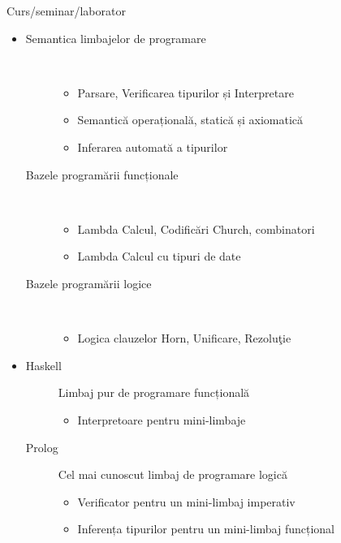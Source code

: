 \documentclass[xcolor=x11names,compress,10pt]{beamer}
\begin{document}
\begin{frame}{Curs/seminar/laborator}
\medskip
\begin{itemize}
\item {}
\begin{description}
\item[Semantica limbajelor de programare] \ 
	\begin{itemize}
	\item Parsare, Verificarea tipurilor și Interpretare
	\item Semantică operațională, statică și axiomatică
	\item Inferarea automată a tipurilor
	\end{itemize}
\item[Bazele programării funcționale] \ 
\begin{itemize}
	\item Lambda Calcul, Codificări Church, combinatori
	\item Lambda Calcul cu tipuri de date
\end{itemize} 
\item[Bazele programării logice] \ 
\begin{itemize}
	\item {Logica clauzelor Horn}, Unificare, Rezolu\c tie
  	\end{itemize}
\end{description}

\item {}
\begin{description}
	\item[Haskell]
		Limbaj pur de programare funcțională
		\begin{itemize}
		\item Interpretoare pentru mini-limbaje
		\end{itemize}
	\item[Prolog]
		Cel mai cunoscut limbaj de programare logic\u a
		\begin{itemize}
		\item Verificator pentru un mini-limbaj imperativ
		\item Inferența tipurilor pentru un mini-limbaj funcțional
		\end{itemize}
\end{description}
\end{itemize}
\end{frame}


\end{document}
